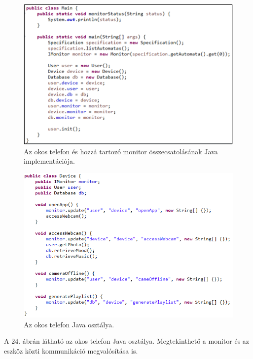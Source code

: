 \begin{figure}[!ht]
    \centering
    \includegraphics[width=150mm, keepaspectratio]{figures/21abra.png}
    \caption{Az okos telefon és hozzá tartozó monitor összecsatolásának Java implementációja.}
\end{figure}

\begin{figure}[!ht]
    \centering
    \includegraphics[width=150mm, keepaspectratio]{figures/22abra.png}
    \caption{Az okos telefon Java osztálya.}
\end{figure}

A 24. ábrán látható az okos telefon Java osztálya. Megtekinthető a monitor és az eszköz közti kommunikáció megvalósítása is.

